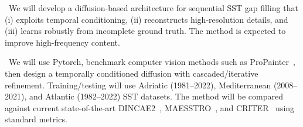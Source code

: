 \documentclass[a4paper, 12pt]{article}
\begin{document}
\ContributionsParagraph~We will develop a diffusion-based architecture for sequential SST gap filling that (i) exploits temporal conditioning, (ii) reconstructs high-resolution details, and (iii) learns robustly from incomplete ground truth. The method is expected to improve high-frequency content.

\MethodologyParagraph~We will use Pytorch, benchmark computer vision methods such as ProPainter~\cite{Zhou2023ProPainter}, then design a temporally conditioned diffusion with cascaded/iterative refinement. Training/testing will use Adriatic (1981–2022), Mediterranean (2008–2021), and Atlantic (1982–2022) SST datasets. The method will be compared against current state-of-the-art DINCAE2~\cite{Barth2022DINCAE2}, MAESSTRO~\cite{Goh2024MAESSTRO}, and CRITER~\cite{Muc2025} using standard metrics.

{\small

 }
\end{document}
